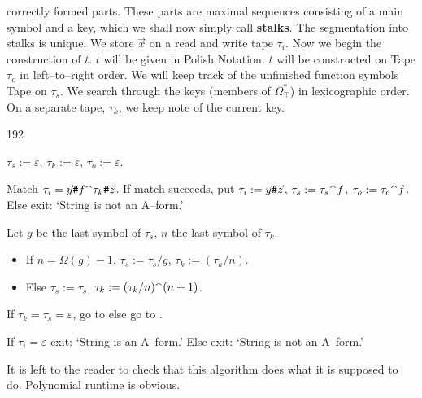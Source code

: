 correctly formed parts. These parts are maximal sequences consisting 
of a main symbol and a key, which we shall now simply call {\bf stalks}. 
The segmentation into stalks is unique. We store $\vec{x}$ on a read and 
write tape $\tau_i$. Now we begin the construction of $t$. $t$ will be 
given in Polish Notation. $t$ will be constructed on Tape $\tau_o$ in 
left--to--right order. We will keep track of the unfinished function 
symbols Tape on $\tau_s$. We search through the keys (members of 
$\Omega_{\intercal}^{\ast}$) in lexicographic order. On a separate tape, 
$\tau_k$, we keep note of the current key. 
\begin{dingautolist}{192}
\item $\tau_s := \varepsilon$, $\tau_k := \varepsilon$, $\tau_o := 
	\varepsilon$.
\item Match $\tau_i = \vec{y}\mbox{\tt \#}f{^{\smallfrown}} \tau_k\mbox{\tt 
\#}\vec{z}$. If match succeeds, put $\tau_i := 
	\vec{y}\mbox{\tt \#}\vec{z}$, $\tau_s := \tau_s {^{\smallfrown}} f$, 
	$\tau_o := \tau_o{^{\smallfrown}} f$. Else exit: `String is not an 
	A--form.'
\item Let $g$ be the last symbol of $\tau_s$, $n$ the last symbol of 
	$\tau_k$. 
\begin{itemize}
	\item
	If $n = \Omega(g) - 1$, $\tau_s := \tau_s/g$, $\tau_k := 
	(\tau_k/n)$. 
\item Else
	$\tau_s := \tau_s$, $\tau_k := (\tau_k/n){^{\smallfrown}} (n+1)$. 
\end{itemize}
\item If $\tau_k = \tau_s = \varepsilon$, go to  else 
	go to .
\item If $\tau_i = \varepsilon$ exit: `String is an A--form.' 
	Else exit: `String is not an A--form.'
\end{dingautolist}
It is left to the reader to check that this algorithm does what it 
is supposed to do. Polynomial runtime is obvious. 
\proofend

